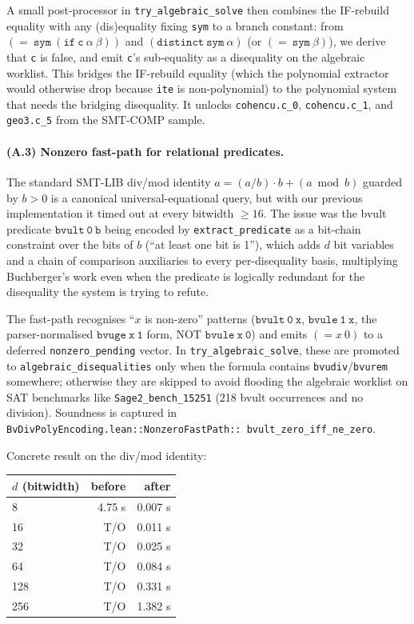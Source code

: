 \documentclass[runningheads]{llncs}
\begin{document}
A small post-processor in \texttt{try\_algebraic\_solve} then
combines the IF-rebuild equality with any (dis)equality fixing
\texttt{sym} to a branch constant: from
$\mathtt{(=\ sym\ (if\ c\ \alpha\ \beta))}$ and
$\mathtt{(distinct\ sym\ \alpha)}$ (or
$\mathtt{(=\ sym\ \beta)}$), we derive that \texttt{c} is false,
and emit \texttt{c}'s sub-equality as a disequality on the
algebraic worklist. This bridges the IF-rebuild equality
(which the polynomial extractor would otherwise drop because
\texttt{ite} is non-polynomial) to the polynomial system that
needs the bridging disequality. It unlocks
\texttt{cohencu.c\_0}, \texttt{cohencu.c\_1}, and
\texttt{geo3.c\_5} from the SMT-COMP sample.

\paragraph{(A.3) Nonzero fast-path for relational predicates.}
The standard SMT-LIB div/mod identity
$a = (a/b) \cdot b + (a \bmod b)$ guarded by $b > 0$ is a
canonical universal-equational query, but with our previous
implementation it timed out at every bitwidth $\geq 16$. The
issue was the bvult predicate $\mathtt{bvult\ 0\ b}$ being
encoded by \texttt{extract\_predicate} as a bit-chain
constraint over the bits of $b$ (``at least one bit is 1''),
which adds $d$ bit variables and a chain of comparison
auxiliaries to every per-disequality basis, multiplying
Buchberger's work even when the predicate is logically
redundant for the disequality the system is trying to refute.

The fast-path recognises ``$x$ is non-zero'' patterns
($\mathtt{bvult\ 0\ x}$, $\mathtt{bvule\ 1\ x}$, the
parser-normalised $\mathtt{bvuge\ x\ 1}$ form, NOT
$\mathtt{bvule\ x\ 0}$) and emits $(= x\ 0)$ to a deferred
\texttt{nonzero\_pending} vector. In
\texttt{try\_algebraic\_solve}, these are promoted to
\texttt{algebraic\_disequalities} only when the formula
contains \texttt{bvudiv}/\texttt{bvurem} somewhere; otherwise
they are skipped to avoid flooding the algebraic worklist on
SAT benchmarks like \texttt{Sage2\_bench\_15251} (218 bvult
occurrences and no division). Soundness is captured in
\texttt{BvDivPolyEncoding.lean::NonzeroFastPath::
bvult\_zero\_iff\_ne\_zero}.

Concrete result on the div/mod identity:

\begin{tabular}{lrr}
\toprule
$d$ (bitwidth) & before & after \\
\midrule
8 & 4.75 s & 0.007 s \\
16 & T/O & 0.011 s \\
32 & T/O & 0.025 s \\
64 & T/O & 0.084 s \\
128 & T/O & 0.331 s \\
256 & T/O & 1.382 s \\
\bottomrule
\end{tabular}
\end{document}
